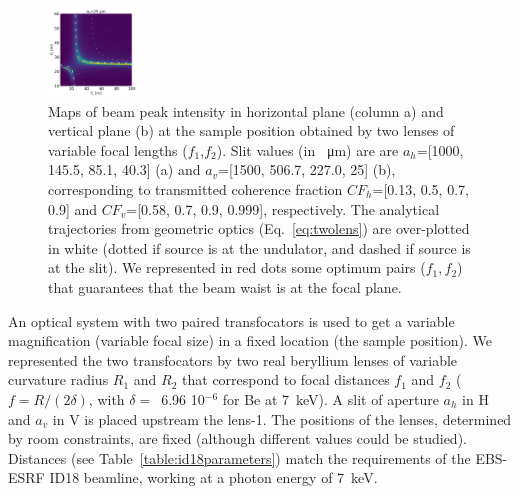 \documentclass[9pt,twocolumn,twoside]{osajnl}
\begin{document}
\begin{figure}[H]
    \includegraphics[width=0.21\textwidth]{figures/V_0.png}
    \caption{
        \label{fig:f1f2map}
    Maps of beam peak intensity in horizontal plane (column a) and vertical plane (b) at the sample position obtained by two lenses of variable focal lengths ($f_1$,$f_2$).
    Slit values (in \SI{}{\micro\meter}) are are $a_h$=[1000, 145.5, 85.1, 40.3] (a) and $a_v$=[1500, 506.7, 227.0, 25] (b), corresponding to transmitted coherence fraction
    $CF_h$=[0.13, 0.5, 0.7, 0.9] and
    $CF_v$=[0.58, 0.7, 0.9, 0.999], respectively.
    The analytical trajectories from geometric optics (Eq.~\ref{eq:twolens}) are over-plotted in white (dotted if source is at the undulator, and dashed if source is at the slit). We represented in red dots some optimum pairs ($f_1,f_2$) that guarantees that the beam waist is at the focal plane.
    }
\end{figure}


An optical system with two paired transfocators is used to get a variable magnification (variable focal size) in a fixed location (the sample position). We represented the two transfocators by two real beryllium lenses of variable curvature radius $R_1$ and $R_2$ that correspond to focal distances $f_1$ and $f_2$ ($f=R/(2 \delta)$, with $\delta=$~6.96 10$^{-6}$ for Be at \SI{7}{keV}). A slit of aperture $a_h$ in H and $a_v$ in V is placed upstream the lens-1. The positions of the lenses, determined by room constraints, are fixed (although different values could be studied). Distances (see Table~\ref{table:id18parameters}) match the requirements of the EBS-ESRF ID18 beamline, working at a photon energy of \SI{7}{keV}.
\end{document}
